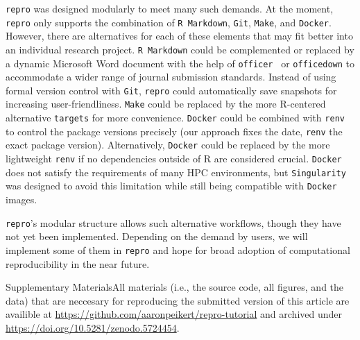 \documentclass[psych,tutorial,accept,moreauthors,pdftex]{Definitions/mdpi}
\begin{document}
\begin{paracol}{2}
\texttt{repro} was designed modularly to meet many such demands. At the
moment, \texttt{repro} only supports the combination of
\texttt{R\ Markdown}, \texttt{Git}, \texttt{Make}, and \texttt{Docker}.
However, there are alternatives for each of these elements that may fit
better into an individual research project. \texttt{R\ Markdown} could
be complemented or replaced by a dynamic Microsoft Word document with
the help of \texttt{officer}~\citep{officer} or \texttt{officedown}
\citep{officedown} to accommodate a wider range of journal submission
standards. Instead of using formal version control with \texttt{Git},
\texttt{repro} could automatically save snapshots for increasing
user-friendliness. \texttt{Make} could be replaced by the more
R-centered alternative \texttt{targets} for more convenience.
\texttt{Docker} could be combined with \texttt{renv}~\citep{R-renv} to
control the package versions precisely (our approach fixes the date,
\texttt{renv} the exact package version). Alternatively, \texttt{Docker}
could be replaced by the more lightweight \texttt{renv} if no
dependencies outside of R are considered crucial. \texttt{Docker} does
not satisfy the requirements of many HPC environments, but
\texttt{Singularity} was designed to avoid this limitation while still
being compatible with \texttt{Docker} images.

\texttt{repro}'s modular structure allows such alternative workflows,
though they have not yet been implemented. Depending on the demand by
users, we will implement some of them in \texttt{repro} and hope for
broad adoption of computational reproducibility in the near future.



\vspace{6pt}

Supplementary Materials{All materials (i.e., the source code, all figures, and the data) that are neccesary for reproducing the submitted version of this article are availible at \url{https://github.com/aaronpeikert/repro-tutorial} and archived under \url{https://doi.org/10.5281/zenodo.5724454}}.




\end{paracol}
\end{document}
